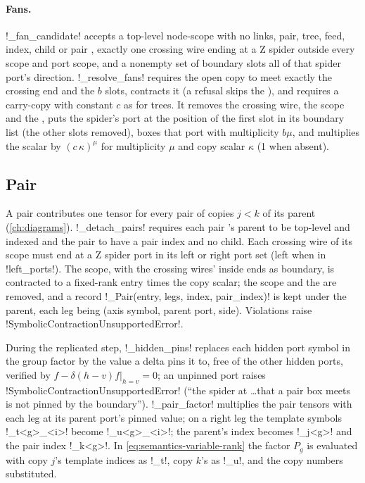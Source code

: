 \paragraph{Fans.} \py!_fan_candidate! accepts a top-level node-scope \bbox{} with no links, pair, tree, feed, index, child or pair \bbox{}, exactly one crossing wire ending at a Z spider outside every \bbox{} scope and port scope, and a nonempty set of boundary slots all of that spider port's direction. \py!_resolve_fans! requires the open copy to meet exactly the crossing end and the $b$ slots, contracts it (a refusal skips the \bbox{}), and requires a carry-copy with constant $c$ as for trees. It removes the crossing wire, the scope and the \bbox{}, puts the spider's port at the position of the first slot in its boundary list (the other slots removed), boxes that port with multiplicity $b\mu$, and multiplies the scalar by $(c\,\kappa)^{\mu}$ for multiplicity $\mu$ and copy scalar $\kappa$ (1 when absent).

\subsection{Pair \texorpdfstring{\bboxes{}}{!-boxes}}\label{sec:semantics-symbolic-pairs}

A pair \bbox{} contributes one tensor for every pair of copies $j<k$ of its parent (\cref{ch:diagrams}). \py!_detach_pairs! requires each pair \bbox{}'s parent to be top-level and indexed and the pair \bbox{} to have a pair index and no child. Each crossing wire of its scope must end at a Z spider port in its left or right port set (left when in \py!left_ports!). The scope, with the crossing wires' inside ends as boundary, is contracted to a fixed-rank entry times the copy scalar; the scope and the \bbox{} are removed, and a record \py!_Pair(entry, legs, index, pair_index)! is kept under the parent, each leg being (axis symbol, parent port, side). Violations raise \py!SymbolicContractionUnsupportedError!.

During the replicated step, \py!_hidden_pins! replaces each hidden port symbol in the group factor by the value a delta pins it to, free of the other hidden ports, verified by $f-\delta(h-v)f|_{h=v}=0$; an unpinned port raises \py!SymbolicContractionUnsupportedError! (``the spider at \ldots that a pair box meets is not pinned by the boundary''). \py!_pair_factor! multiplies the pair tensors with each leg at its parent port's pinned value; on a right leg the template symbols \code!_t<g>_<i>! become \code!_u<g>_<i>!; the parent's index becomes \code!_j<g>! and the pair index \code!_k<g>!. In \cref{eq:semantics-variable-rank} the factor $P_g$ is evaluated with copy $j$'s template indices as \code!_t!, copy $k$'s as \code!_u!, and the copy numbers substituted.

